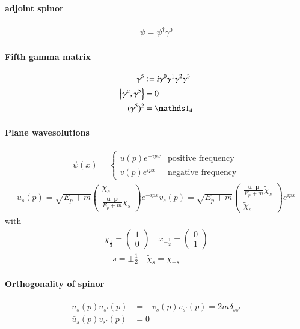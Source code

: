 \paragraph{adjoint spinor}
\begin{align}
	\bar{\psi} = \psi^\dagger \gamma^0
\end{align}
\paragraph{Fifth gamma matrix}
\begin{align}
	\gamma^5 &\defeq i \gamma^0 \gamma^1 \gamma^2 \gamma^3 \\
	\left\{ \gamma^\mu, \gamma^5 \right\} &= 0 \\
	(\gamma^5)^2 &= \id_4
\end{align}
\paragraph{Plane wavesolutions}
\begin{align}
	\psi(x) = \begin{cases}
		u(p) e^{-ipx} & \text{positive frequency} \\
		v(p) e^{ipx} & \text{negative frequency}
	\end{cases}
\end{align}
\begin{align}
	u_s	(p) = \sqrt{E_p+m} \begin{pmatrix} \chi_s \\ \frac{\pmb{u}\cdot\pmb{p}}{E_p+m}\chi_s\end{pmatrix} e^{-ipx}
	v_s	(p) = \sqrt{E_p+m} \begin{pmatrix} \frac{\pmb{u}\cdot\pmb{p}}{E_p+m}\tilde{\chi}_s \\ \tilde{\chi}_s \end{pmatrix} e^{ipx}
\end{align}
with
\begin{align*}
	\chi_{\frac{1}{2}} = \begin{pmatrix} 1 \\ 0 \end{pmatrix} \quad x_{-\frac{1}{2}} = \begin{pmatrix} 0 \\ 1\end{pmatrix} \\
	\quad s=\pm\frac{1}{2} \quad \tilde{\chi}_s = \chi_{-s}
\end{align*}
\paragraph{Orthogonality of spinor}
\begin{align}
	\bar{u}_s(p) u_{s'}(p) &= -\bar{v}_s(p) v_{s'}(p) = 2m \delta_{ss'} \\
	\bar{u}_s(p) v_{s'}(p) &= 0
\end{align}
